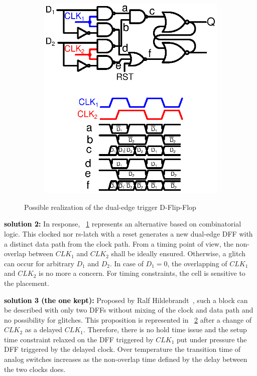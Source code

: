 \begin{figure}[htp]
\begin{subfigure}[b]{0.48\textwidth}
		\includegraphics[width=\textwidth]{Chapter4/Figs/det-dff-solution2.ps}
		\label{fig:solution-2}
	\end{subfigure}
	\caption{Possible realization of the dual-edge trigger D-Flip-Flop}
	\label{fig:digital-non-overlap}
\end{figure}

\textbf{\textcolor{black}{solution 2:}}
In response, \figurename~\ref{fig:solution-2} represents an alternative based on combinatorial logic. This clocked nor rs-latch with a reset generates a new dual-edge DFF with a distinct data path from the clock path. From a timing point of view, the non-overlap between \(CLK_1\) and \(CLK_2\) shall be ideally ensured. Otherwise, a glitch can occur for arbitrary \(D_1\) and \(D_2\). In case of \(D_1 = 0\), the overlapping of \(CLK_1\) and \(CLK_2\) is no more a concern. For timing constraints, the cell is sensitive to the placement.

\textbf{\textcolor{black}{solution 3 (the one kept):}}
Proposed by Ralf Hildebrandt~\cite{RalfHildbrandt}, such a block can be described with only two DFFs without mixing of the clock and data path and no possibility for glitches. This proposition is represented in \figurename~\ref{fig:digital-non-overlap} after a change of \(CLK_2\) as a delayed \(CLK_1\). Therefore, there is no hold time issue and the setup time constraint relaxed on the DFF triggered by \(CLK_1\) put under pressure the DFF triggered by the delayed clock. Over temperature the transition time of analog switches increases as the non-overlap time defined by the delay between the two clocks does.

